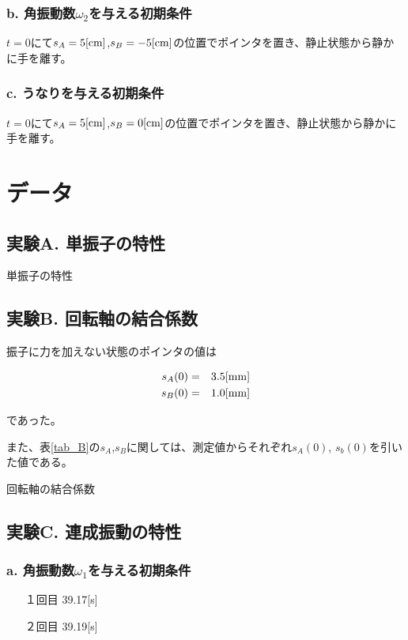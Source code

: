 \documentclass[uplatex,11pt]{jsarticle}
\newcommand{\tab}[4]{ %
    \begin{table}[htb]
        \centering
        \caption{#3}
        
        \label{tab_#1}
    \end{table}
}
\newcommand{\tr}[1]{表\ref{tab_#1}}
\begin{document}
\subsubsection*{b. 角振動数$\omega_2$を与える初期条件}
$t=0$にて$s_A = 5[{\rm cm}]$,$s_B = - 5[{\rm cm}]$の位置でポインタを置き、静止状態から静かに手を離す。

\subsubsection*{c. うなりを与える初期条件}
$t=0$にて$s_A = 5[{\rm cm}]$,$s_B = 0[{\rm cm}]$の位置でポインタを置き、静止状態から静かに手を離す。

\section{データ}

\subsection*{実験A. 単振子の特性}

\tab{A}{csv/A.csv}{単振子の特性}{1}

\subsection*{実験B. 回転軸の結合係数}

振子に力を加えない状態のポインタの値は

\begin{eqnarray*}
    s_A(0) & = & 3.5[{\rm mm}] \\
    s_B(0) & = & 1.0[{\rm mm}]
\end{eqnarray*}

であった。

また、\tr{B}の$s_A$,$s_B$に関しては、測定値からそれぞれ$s_A(0)$, $s_b(0)$を引いた値である。

\tab{B}{csv/B.csv}{回転軸の結合係数}{3}

\subsection*{実験C. 連成振動の特性}

\subsubsection*{a. 角振動数$\omega_1$を与える初期条件}
\begin{itemize}
    \item[１回目] 39.17[s]
    \item[２回目] 39.19[s]
\end{itemize}
\end{document}
